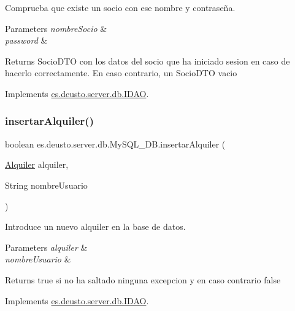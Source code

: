 Comprueba que existe un socio con ese nombre y contraseña. 
\begin{DoxyParams}{Parameters}
{\em nombre\+Socio} & \\
\hline
{\em password} & \\
\hline
\end{DoxyParams}
\begin{DoxyReturn}{Returns}
Socio\+D\+TO con los datos del socio que ha iniciado sesion en caso de hacerlo correctamente. En caso contrario, un Socio\+D\+TO vacio 
\end{DoxyReturn}


Implements \mbox{\hyperlink{interfacees_1_1deusto_1_1server_1_1db_1_1_i_d_a_o_a5ec0443a5c196f3545f89c3716450e42}{es.\+deusto.\+server.\+db.\+I\+D\+AO}}.

\mbox{\label{classes_1_1deusto_1_1server_1_1db_1_1_my_s_q_l___d_b_aa72369de0326a5904e3e9c83a3bff777}} 
\subsubsection{\texorpdfstring{insertarAlquiler()}{insertarAlquiler()}}
{\footnotesize\ttfamily boolean es.\+deusto.\+server.\+db.\+My\+S\+Q\+L\+\_\+\+D\+B.\+insertar\+Alquiler (\begin{DoxyParamCaption}\item[{\mbox{\hyperlink{classes_1_1deusto_1_1client_1_1data_1_1_alquiler}{Alquiler}}}]{alquiler,  }\item[{String}]{nombre\+Usuario }\end{DoxyParamCaption})}

Introduce un nuevo alquiler en la base de datos. 
\begin{DoxyParams}{Parameters}
{\em alquiler} & \\
\hline
{\em nombre\+Usuario} & \\
\hline
\end{DoxyParams}
\begin{DoxyReturn}{Returns}
true si no ha saltado ninguna excepcion y en caso contrario false 
\end{DoxyReturn}


Implements \mbox{\hyperlink{interfacees_1_1deusto_1_1server_1_1db_1_1_i_d_a_o_a3a79fb98127799a4f66c0a90006b0311}{es.\+deusto.\+server.\+db.\+I\+D\+AO}}.

